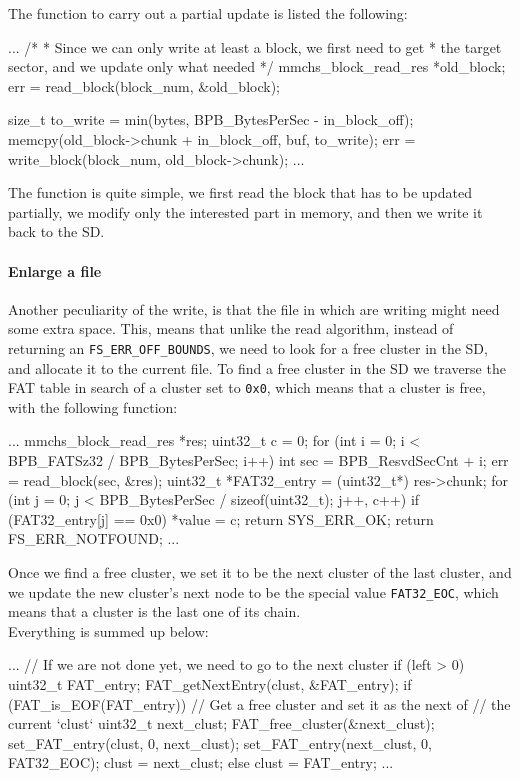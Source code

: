 \documentclass[a4paper,twoside,openright]{report}
\begin{document}
The function to carry out a partial update is listed the following:
\begin{pandacode}
...
/*
* Since we can only write at least a block, we first need to get
* the target sector, and we update only what needed
*/
mmchs_block_read_res *old_block;
err = read_block(block_num, &old_block);

size_t to_write = min(bytes, BPB_BytesPerSec - in_block_off);
memcpy(old_block->chunk + in_block_off, buf, to_write);
err = write_block(block_num, old_block->chunk);
...
\end{pandacode} 

The function is quite simple, we first read the block that has to be updated partially, we modify only the interested part in memory, and then we write it back to the SD.

\paragraph{Enlarge a file}
Another peculiarity of the write, is that the file in which are writing might need some extra space.
This, means that unlike the read algorithm, instead of returning an \texttt{FS\_ERR\_OFF\_BOUNDS}, we need to look for a free cluster in the SD, and allocate it to the current file.
To find a free cluster in the SD we traverse the FAT table in search of a cluster set to \texttt{0x0}, which means that a cluster is free, with the following function:
\begin{pandacode}
...
mmchs_block_read_res *res;
uint32_t c = 0;
for (int i = 0; i < BPB_FATSz32 / BPB_BytesPerSec; i++) {
    int sec = BPB_ResvdSecCnt + i;
    err = read_block(sec, &res);
    uint32_t *FAT32_entry = (uint32_t*) res->chunk;
    for (int j = 0; j < BPB_BytesPerSec / sizeof(uint32_t); j++, c++) {
        if (FAT32_entry[j] == 0x0) {
            *value = c;
            return SYS_ERR_OK;
        }
    }
}
return FS_ERR_NOTFOUND;
...
\end{pandacode} 
Once we find a free cluster, we set it to be the next cluster of the last cluster, and we update the new cluster's next node to be the special value \texttt{FAT32\_EOC}, which means that a cluster is the last one of its chain.\\
Everything is summed up below:
\begin{pandacode}
...
// If we are not done yet, we need to go to the next cluster
if (left > 0) {
    uint32_t FAT_entry; FAT_getNextEntry(clust, &FAT_entry);
    if (FAT_is_EOF(FAT_entry)) {
        // Get a free cluster and set it as the next of
        // the current `clust`
        uint32_t next_clust; FAT_free_cluster(&next_clust);
        set_FAT_entry(clust, 0, next_clust);
        set_FAT_entry(next_clust, 0, FAT32_EOC);
        clust = next_clust;
    } else {
        clust = FAT_entry;
    }
    ...
}
\end{pandacode} 
\end{document}
